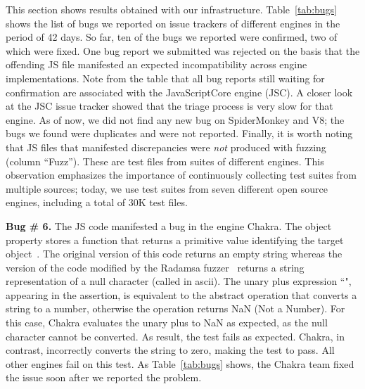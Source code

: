 \documentclass[10pt,conference,anonymous]{IEEEtran}
\begin{document}
This section shows results obtained with our
infrastructure. Table~\ref{tab:bugs} shows the list of bugs we
reported on issue trackers of different engines in the period of 42
days. So far, ten of the bugs we reported
were confirmed, two of which were fixed. One bug report we
submitted was rejected on the basis that the offending JS file
manifested an expected incompatibility across engine
implementations.
Note from the table that all bug
reports still waiting for confirmation are associated with the
JavaScriptCore engine (JSC). A closer look at the JSC issue tracker
showed that the triage process is very slow for that engine. 
As of now, we did not find any new bug on SpiderMonkey and V8; 
the bugs we found were duplicates and were not reported. Finally, it is
worth noting that  JS files that manifested
discrepancies were \emph{not} produced with fuzzing (column
``Fuzz''). These are test files from suites of different engines. This
observation emphasizes the importance of continuously collecting test suites from
multiple sources; today, we use test suites from seven different open
source engines, including a total of 30K test files.

 

\vspace{1ex}\noindent\textbf{Bug \# 6.} The JS code  
manifested a bug in the \js{} engine Chakra.  The object
property  stores a function that returns a primitive
value identifying the target object~\cite{valueof}. The original
version of this code returns an empty string whereas the version of
the code modified by the Radamsa fuzzer~\cite{radamsa} returns a string
representation of a null character (called  in ascii). The
unary plus expression ``", appearing in the assertion, is
equivalent to the abstract operation 
that converts a string to a number, otherwise the operation returns
NaN (Not a Number)\cite{unary-plus}. For this case, Chakra evaluates
the unary plus to NaN as expected, as the null character cannot be
converted. As result, the test fails as expected. Chakra, in contrast,
incorrectly converts the string to zero, making the test to pass. All
other engines fail on this test. As Table~\ref{tab:bugs} shows, the
Chakra team fixed the issue soon after we reported the problem.
\end{document}
